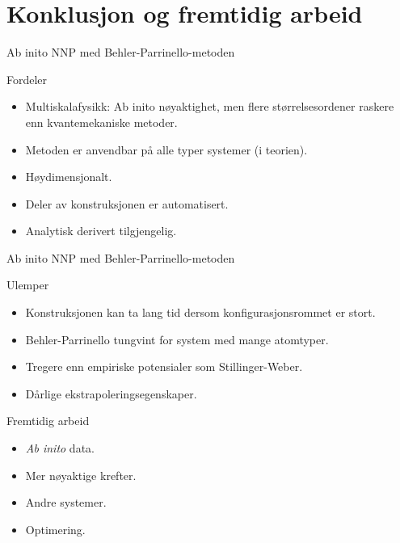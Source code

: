 \documentclass{beamer}
\begin{document}
\section{Konklusjon og fremtidig arbeid}


\begin{frame}{Ab inito NNP med Behler-Parrinello-metoden}

\begin{block}{Fordeler}
 \begin{itemize}
  \item Multiskalafysikk: Ab inito nøyaktighet, men flere størrelsesordener raskere enn kvantemekaniske metoder.  
  \item Metoden er anvendbar på alle typer systemer (i teorien). 
  \item Høydimensjonalt. 
  \item Deler av konstruksjonen er automatisert. 
  \item Analytisk derivert tilgjengelig. 
 \end{itemize}
\end{block}

\end{frame}


\begin{frame}{Ab inito NNP med Behler-Parrinello-metoden}

\begin{block}{Ulemper}
 \begin{itemize}
  \item Konstruksjonen kan ta lang tid dersom konfigurasjonsrommet er stort. 
  \item Behler-Parrinello tungvint for system med mange atomtyper. 
  \item Tregere enn empiriske potensialer som Stillinger-Weber. 
  \item Dårlige ekstrapoleringsegenskaper. 
 \end{itemize}
\end{block}

\end{frame}


\begin{frame}

\begin{block}{Fremtidig arbeid}
 \begin{itemize}
  \item \textit{Ab inito} data. 
  \item Mer nøyaktige krefter. 
  \item Andre systemer. 
  \item Optimering. 
 \end{itemize}
\end{block}

\end{frame}
\end{document}
